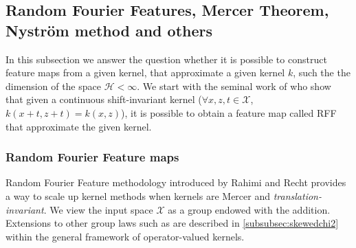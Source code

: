 \subsection{Random Fourier Features, Mercer Theorem, Nystr\"om method and
others}
In this subsection we answer the question whether it is possible to construct
feature maps from a given kernel, that approximate a given kernel $k$, such the
the dimension of the space $\mathcal{H} < \infty$. We start with the seminal
work of \citet{Rahimi2007} who show that given a continuous shift-invariant
kernel ($\forall x, z, t \in \mathcal{X}$, $k(x + t, z + t) = k(x, z)$), it is
possible to obtain a feature map called \acs{RFF} that approximate the given
kernel.
\subsubsection{Random Fourier Feature maps}
Random Fourier Feature methodology introduced  by Rahimi and Recht
\cite{Rahimi2007} provides a way to scale up kernel methods when kernels are
Mercer and \emph{translation-invariant}.  We view the input space $\mathcal{X}$
as a group endowed with the addition. Extensions to other group laws such as
\cite{li2010random} are described in \cref{subsubsec:skewedchi2} within the
general framework of operator-valued kernels.
